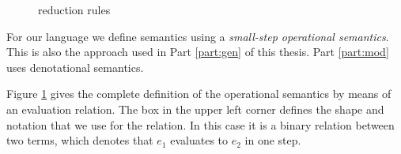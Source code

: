 {\begin{figure}[t]
  \centering
  \caption{\stlcbool reduction rules}
  \label{fig:intro:stlcbooleval}
\end{figure}

For our \stlcbool language we define semantics using a \emph{small-step
  operational semantics}. This is also the approach used in Part \ref{part:gen}
of this thesis. Part \ref{part:mod} uses denotational semantics.

Figure \ref{fig:intro:stlcbooleval} gives the complete definition of the
operational semantics by means of an evaluation relation. The box in the upper
left corner  defines the shape and notation
that we use for the relation. In this case it is a binary relation between two
terms, which denotes that $e_1$ evaluates to $e_2$ in one step.

}
